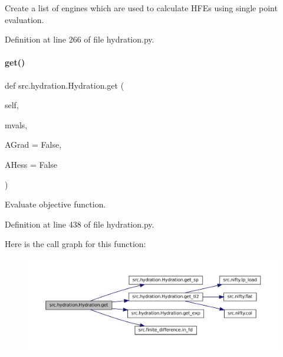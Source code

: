 Create a list of engines which are used to calculate H\+F\+Es using single point evaluation. 



Definition at line 266 of file hydration.\+py.

\mbox{\label{classsrc_1_1hydration_1_1Hydration_adecf668bde832dee5cbb038873bcce57}} 
\paragraph{\texorpdfstring{get()}{get()}}
{\footnotesize\ttfamily def src.\+hydration.\+Hydration.\+get (\begin{DoxyParamCaption}\item[{}]{self,  }\item[{}]{mvals,  }\item[{}]{A\+Grad = {\ttfamily False},  }\item[{}]{A\+Hess = {\ttfamily False} }\end{DoxyParamCaption})}



Evaluate objective function. 



Definition at line 438 of file hydration.\+py.

Here is the call graph for this function\+:
\nopagebreak
\begin{figure}[H]
\begin{center}
\leavevmode
\includegraphics[width=350pt]{classsrc_1_1hydration_1_1Hydration_adecf668bde832dee5cbb038873bcce57_cgraph}
\end{center}
\end{figure}
\mbox{\label{classsrc_1_1hydration_1_1Hydration_a4f0f4e2131130f0c59b1ace29eb78001}} 
